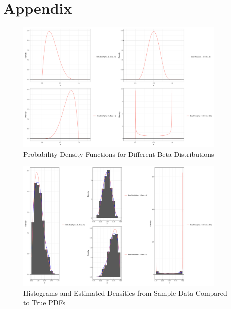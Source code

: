 \documentclass{article}\usepackage[]{graphicx}\usepackage[]{xcolor}
\begin{document}
\newpage
\onecolumn
\section{Appendix}

\begin{figure}[h]
\centering
\includegraphics[width=0.9\textwidth]{beta_distributions.pdf}
\caption{Probability Density Functions for Different Beta Distributions}
\end{figure}

\begin{figure}[h]
\centering
\includegraphics[width=0.9\textwidth]{sample_beta_distributions.pdf}
\caption{Histograms and Estimated Densities from Sample Data Compared to True PDFs}
\end{figure}
\end{document}

